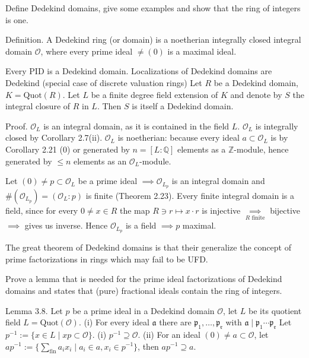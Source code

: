 Define Dedekind domains, give some examples and show that the ring of integers is one.

Definition.
A Dedekind ring (or domain) is a noetherian integrally closed
integral domain \( \mathcal{O} \), where every prime ideal \( \neq (0) \) is a maximal ideal.

Every PID is a Dedekind domain.
Localizations of Dedekind domains are Dedekind
(special case of discrete valuation rings)
Let \( R \) be a Dedekind domain, \( K = \text{Quot}(R)\).
Let \( L \) be a finite degree field extension of \( K \) and denote by \( S \) 
the integral closure of \( R \) in \( L \). Then \( S \) is itself a Dedekind domain.


Proof. 
\(\mathcal{O}_L\) is an integral domain, as it is contained in the field \(L\).
\(\mathcal{O}_L\) is integrally closed by Corollary 2.7(ii).
\(\mathcal{O}_L\) is noetherian: because every ideal \(a \subset \mathcal{O}_L\) is by Corollary 2.21 (0) or generated by 
\(n = [L : \mathbb{Q}]\) elements as a \(\mathbb{Z}\)-module, hence generated by \(\leq n\) elements as an \(\mathcal{O}_L\)-module.

Let \((0) \neq p \subset \mathcal{O}_L\) be a prime ideal \(\implies \mathcal{O}_{L_p}\) is an integral domain and 
\(\#(\mathcal{O}_{L_p}) = (\mathcal{O}_L : p)\) is finite (Theorem 2.23). Every finite integral domain is a field, 
since for every \(0 \neq x \in R\) the map \(R \ni r \mapsto x \cdot r\) is injective \(\underset{R \text{ finite}}{\implies}\) 
bijective \(\implies\) gives us inverse. Hence \(\mathcal{O}_{L_p}\) is a field \(\implies p\) maximal.

The great theorem of Dedekind domains is that their generalize the concept of prime factorizations
in rings which may fail to be UFD.


Prove a lemma that is needed for the prime ideal factorizations of Dedekind domains
and states that (pure) fractional ideals contain the ring of integers.

Lemma 3.8. 
Let \( p \) be a prime ideal in a Dedekind domain \(\mathcal{O}\), let \( L \) be its quotient field \( L = \text{Quot}(\mathcal{O}) \).
(i) For every ideal \( \mathfrak{a} \) there are \( \mathfrak{p_1}, \dots, \mathfrak{p_r} \) with \( \mathfrak{a} \mid \mathfrak{p_1}\cdots\mathfrak{p_r}\)
Let \( p^{-1} := \{ x \in L \mid xp \subset \mathcal{O} \} \).
(i) \( p^{-1} \supseteq \mathcal{O} \).
(ii) For an ideal \( (0) \neq a \subset \mathcal{O} \), let \( ap^{-1} := \{ \sum_{\text{fin}} a_ix_i \mid a_i \in a, x_i \in p^{-1} \} \), then \( ap^{-1} \supseteq a \).

